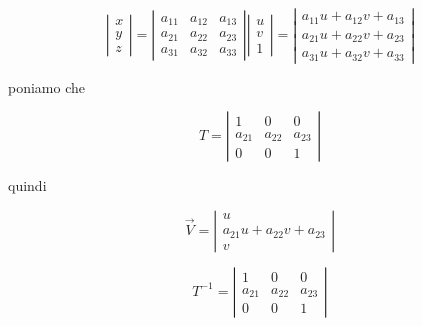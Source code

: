 \documentclass[a4paper,11pt]{article}
\begin{document}
\[
\left |
\begin{array}{l}
	x
\\
	y
\\
	z
\end{array}
\right |
=
\left |
\begin{array}{lll}
	a_{11} & a_{12} & a_{13}
\\
	a_{21} & a_{22} & a_{23}
\\
	a_{31} & a_{32} & a_{33}
\end{array}
\right |
\left |
\begin{array}{l}
	u
\\
	v
\\
	1
\end{array}
\right |
=
\left |
\begin{array}{l}
	a_{11} u + a_{12} v + a_{13}
\\
	a_{21} u + a_{22} v + a_{23}
\\
	a_{31} u + a_{32} v + a_{33}
\end{array}
\right |
\]

poniamo che

\[
T = 
\left |
\begin{array}{lll}
	1 & 0 & 0
\\
	a_{21} & a_{22} & a_{23}
\\
	0 & 0 & 1
\end{array}
\right |
\]

quindi

\[
 \vec V = 
\left |
\begin{array}{l}
	u
\\
	a_{21} u + a_{22} v + a_{23}
\\
	v
\end{array}
\right |
\]

\[
T^{-1} = 
\left |
\begin{array}{lll}
	1 & 0 & 0
\\
	a_{21} & a_{22} & a_{23}
\\
	0 & 0 & 1
\end{array}
\right |
\]
\end{document}
